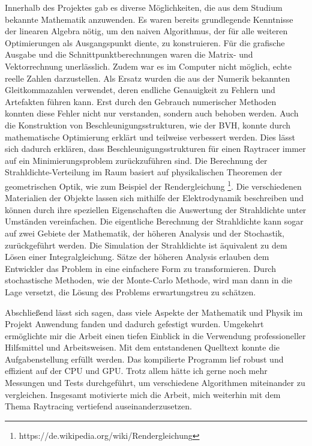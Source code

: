 \documentclass[crop=false]{standalone}
\begin{document}
    Innerhalb des Projektes gab es diverse Möglichkeiten, die aus dem Studium bekannte Mathematik anzuwenden.
    Es waren bereits grundlegende Kenntnisse der linearen Algebra nötig, um den naiven Algorithmus, der für alle weiteren Optimierungen als Ausgangspunkt diente, zu konstruieren.
    Für die grafische Ausgabe und die Schnittpunktberechnungen waren die Matrix- und Vektorrechnung unerlässlich.
    Zudem war es im Computer nicht möglich, echte reelle Zahlen darzustellen.
    Als Ersatz wurden die aus der Numerik bekannten Gleitkommazahlen verwendet, deren endliche Genauigkeit zu Fehlern und Artefakten führen kann.
    Erst durch den Gebrauch numerischer Methoden konnten diese Fehler nicht nur verstanden, sondern auch behoben werden.
    Auch die Konstruktion von Beschleunigungsstrukturen, wie der BVH, konnte durch mathematische Optimierung erklärt und teilweise verbessert werden.
    Dies lässt sich dadurch erklären, dass Beschleunigungsstrukturen für einen Raytracer immer auf ein Minimierungsproblem zurückzuführen sind.
    Die Berechnung der Strahldichte-Verteilung im Raum basiert auf physikalischen Theoremen der geometrischen Optik, wie zum Beispiel der Rendergleichung%
    \footnote{https://de.wikipedia.org/wiki/Rendergleichung}.
    Die verschiedenen Materialien der Objekte lassen sich mithilfe der Elektrodynamik beschreiben und können durch ihre speziellen Eigenschaften die Auswertung der Strahldichte unter Umständen vereinfachen.
    Die eigentliche Berechnung der Strahldichte kann sogar auf zwei Gebiete der Mathematik, der höheren Analysis und der Stochastik, zurückgeführt werden.
    Die Simulation der Strahldichte ist äquivalent zu dem Lösen einer Integralgleichung.
    Sätze der höheren Analysis erlauben dem Entwickler das Problem in eine einfachere Form zu transformieren.
    Durch stochastische Methoden, wie der Monte-Carlo Methode, wird man dann in die Lage versetzt, die Lösung des Problems erwartungstreu zu schätzen.

    Abschließend lässt sich sagen, dass viele Aspekte der Mathematik und Physik im Projekt Anwendung fanden und dadurch gefestigt wurden.
    Umgekehrt ermöglichte mir die Arbeit einen tiefen Einblick in die Verwendung professioneller Hilfsmittel und Arbeitsweisen.
    Mit dem entstandenen Quelltext konnte die Aufgabenstellung erfüllt werden.
    Das kompilierte Programm lief robust und effizient auf der CPU und GPU.
    Trotz allem hätte ich gerne noch mehr Messungen und Tests durchgeführt, um verschiedene Algorithmen miteinander zu vergleichen.
    Insgesamt motivierte mich die Arbeit, mich weiterhin mit dem Thema Raytracing vertiefend auseinanderzusetzen.
\end{document}

